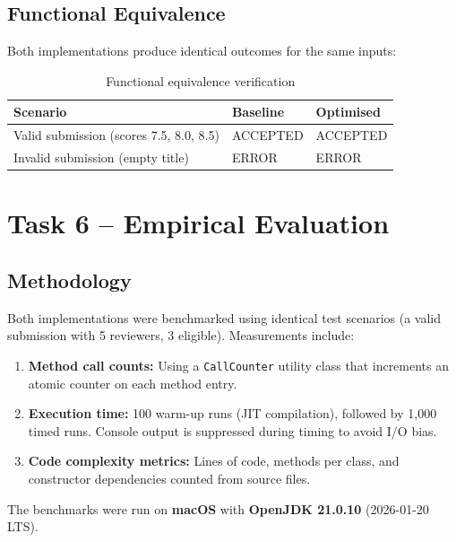 \documentclass[12pt, a4paper]{article}
\begin{document}
\subsection{Functional Equivalence}

Both implementations produce identical outcomes for the same inputs:

\begin{table}[h]
\centering
\caption{Functional equivalence verification}
\label{tab:equivalence}
\begin{tabular}{l l l}
    \toprule
    \textbf{Scenario} & \textbf{Baseline} & \textbf{Optimised} \\
    \midrule
    Valid submission (scores 7.5, 8.0, 8.5) & ACCEPTED & ACCEPTED \\
    Invalid submission (empty title) & ERROR & ERROR \\
    \bottomrule
\end{tabular}
\end{table}

\section{Task 6 -- Empirical Evaluation}
\label{sec:task6}

\subsection{Methodology}

Both implementations were benchmarked using identical test scenarios (a valid submission with 5 reviewers, 3 eligible). Measurements include:

\begin{enumerate}[nosep]
    \item \textbf{Method call counts:} Using a \texttt{CallCounter} utility class that increments an atomic counter on each method entry.
    \item \textbf{Execution time:} 100 warm-up runs (JIT compilation), followed by 1{,}000 timed runs. Console output is suppressed during timing to avoid I/O bias.
    \item \textbf{Code complexity metrics:} Lines of code, methods per class, and constructor dependencies counted from source files.
\end{enumerate}

The benchmarks were run on \textbf{macOS} with \textbf{OpenJDK 21.0.10} (2026-01-20 LTS).
\end{document}
